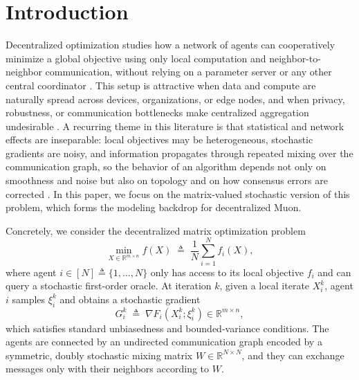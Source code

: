 \documentclass{article}
\begin{document}
\allowdisplaybreaks

\newpage

\section{Introduction}
\label{sec:introduction}

Decentralized optimization studies how a network of agents can cooperatively minimize a global objective using only local computation and neighbor-to-neighbor communication, without relying on a parameter server or any other central coordinator \citep{yang2019survey,nedic2018multi,lian2017can}. This setup is attractive when data and compute are naturally spread across devices, organizations, or edge nodes, and when privacy, robustness, or communication bottlenecks make centralized aggregation undesirable \citep{blot2016gossip,daily2018gossipgrad,yuan2022decentralized}. A recurring theme in this literature is that statistical and network effects are inseparable: local objectives may be heterogeneous, stochastic gradients are noisy, and information propagates through repeated mixing over the communication graph, so the behavior of an algorithm depends not only on smoothness and noise but also on topology and on how consensus errors are corrected \citep{shi2015extra,tang2018d,pu2021distributed,alghunaim2022unified,ying2021exponential}. In this paper, we focus on the matrix-valued stochastic version of this problem, which forms the modeling backdrop for decentralized Muon.


Concretely, we consider the decentralized matrix optimization problem
\begin{equation}
    \label{eq:intro-decentralized-problem}
    \min_{X\in\mathbb{R}^{m\times n}} f(X) \;\triangleq\; \frac{1}{N}\sum_{i=1}^N f_i(X),
\end{equation}
where agent $i\in[N]\triangleq\{1,\dots,N\}$ only has access to its local objective $f_i$ and can query a stochastic first-order oracle. At iteration $k$, given a local iterate $X_i^k$, agent $i$ samples $\xi_i^k$ and obtains a stochastic gradient
\begin{equation}
    \label{eq:intro-local-oracle}
    G_i^k \;\triangleq\; \nabla F_i(X_i^k;\xi_i^k)\in\mathbb{R}^{m\times n},
\end{equation}
which satisfies standard unbiasedness and bounded-variance conditions. The agents are connected by an undirected communication graph encoded by a symmetric, doubly stochastic mixing matrix $W\in\mathbb{R}^{N\times N}$, and they can exchange messages only with their neighbors according to $W$.
\end{document}
